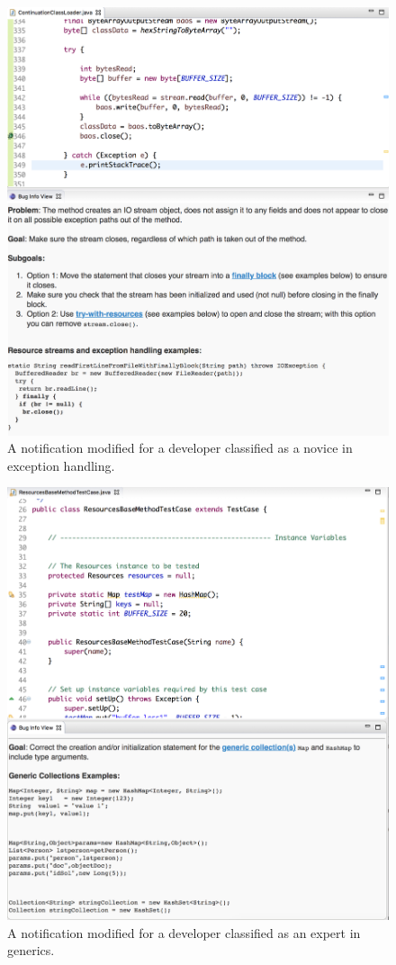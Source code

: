 \begin{figure}
	\centering
	\includegraphics[width=5.5in]{Chapter-7/figs/novice}
	\caption{A notification modified for a developer classified as a novice in  exception handling.}
	\label{fig:novice}
\end{figure}

\begin{figure}
	\centering
	\includegraphics[width=5.5in]{Chapter-7/figs/expert}
	\caption{A notification modified for a developer classified as an expert in  generics.}
	\label{fig:expert}
\end{figure}

